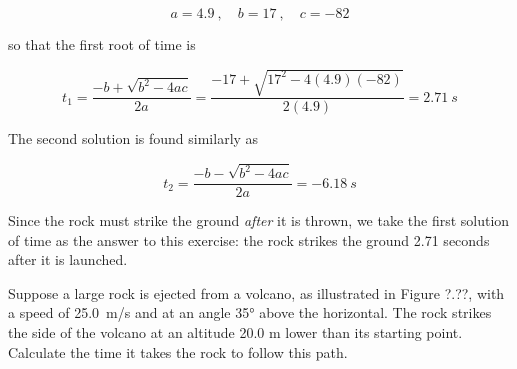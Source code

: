 \documentclass[main.tex]{subfiles}
\begin{document}
\begin{equation*}
    a = 4.9\ , \quad b = 17\ ,\quad c = -82
\end{equation*}

so that the first root of time is

\begin{equation*}
    t_1 = \frac{-b + \sqrt{b^2 - 4ac}}{2a} = \frac{-17 + \sqrt{17^2 - 4(4.9)(-82)}}{2(4.9)} = \SI{2.71}{s}
\end{equation*}

The second solution is found similarly as

\begin{equation*}
    t_2 = \frac{-b - \sqrt{b^2 - 4ac}}{2a} = \SI{-6.18}{s}
\end{equation*}

Since the rock must strike the ground \textit{after} it is thrown, we take the first solution of time as the answer to this exercise: the rock strikes the ground 2.71 seconds after it is launched. 

\endsolution

\begin{example}
    Suppose a large rock is ejected from a volcano, as illustrated in Figure ?.??, with a speed of  \SI{25.0}{m/s} and at an angle \ang{35} above the horizontal. The rock strikes the side of the volcano at an altitude 20.0 m lower than its starting point. Calculate the time it takes the rock to follow this path.
\end{example}
\end{document}
